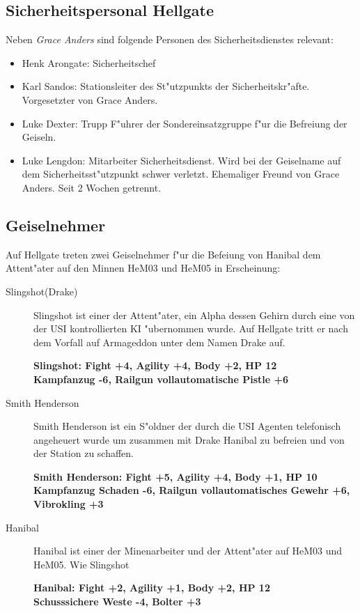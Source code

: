 \subsection{Sicherheitspersonal Hellgate}

Neben \emph{Grace Anders} sind folgende Personen des Sicherheitsdienstes relevant:

\begin{itemize}
    \item Henk Arongate: Sicherheitschef    
    \item Karl Sandos: Stationsleiter des St"utzpunkts der Sicherheitskr"afte. Vorgesetzter von Grace Anders.
    \item Luke Dexter: Trupp F"uhrer der Sondereinsatzgruppe f"ur die Befreiung der Geiseln.
    \item Luke Lengdon: Mitarbeiter Sicherheitsdienst. Wird bei der Geiselname auf dem Sicherheitsst"utzpunkt schwer 
    verletzt. Ehemaliger Freund von Grace Anders. Seit 2 Wochen getrennt.
\end{itemize}

\subsection{Geiselnehmer}

Auf Hellgate treten zwei Geiselnehmer f"ur die Befeiung von Hanibal dem Attent"ater auf den Minnen HeM03 und HeM05 in
Erscheinung:

\begin{description}
    \item[Slingshot(Drake)] Slingshot ist einer der Attent"ater, ein Alpha dessen Gehirn durch eine von der USI kontrollierten 
    KI "ubernommen wurde. Auf Hellgate tritt er nach dem Vorfall auf Armageddon unter dem Namen Drake auf.

    \textbf{Slingshot: Fight +4, Agility +4, Body +2, HP 12\\
    Kampfanzug -6, Railgun vollautomatische Pistle +6}

    \item[Smith Henderson] Smith Henderson ist ein S"oldner der durch die USI Agenten telefonisch angeheuert wurde um 
    zusammen mit Drake Hanibal zu befreien und von der Station zu schaffen.

    \textbf{Smith Henderson: Fight +5, Agility +4, Body +1, HP 10\\
    Kampfanzug Schaden -6, Railgun vollautomatisches Gewehr +6, Vibrokling +3}

    \item[Hanibal] Hanibal ist einer der Minenarbeiter und der Attent"ater auf HeM03 und HeM05. Wie Slingshot 

    \textbf{Hanibal: Fight +2, Agility +1, Body +2, HP 12\\
    Schusssichere Weste -4, Bolter +3}
\end{description}



